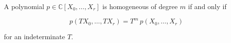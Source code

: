 A polynomial $p \in \mathbb{C}[X_0, \ldots, X_r]$ is homogeneous of degree $m$ if and only if

$$
p(T X_0, \ldots, T X_r) = T^{m} \, p(X_0, \ldots, X_r)
$$

for an indeterminate $T$.
